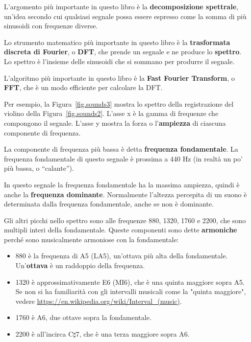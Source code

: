 \documentclass[12pt,a4paper]{book}
\begin{document}
L'argomento più importante in questo libro è la {\bf decomposizione spettrale}, un'idea secondo cui qualsiasi segnale possa essere espresso come la somma di più sinusoidi con frequenze diverse.

Lo strumento matematico più importante in questo libro è la {\bf trasformata discreta di Fourier}, o {\bf DFT}, che prende un segnale e ne produce lo {\bf spettro}. Lo spettro è l'insieme delle sinusoidi che si sommano per produrre il segnale.

L'algoritmo più importante in questo libro è la {\bf Fast Fourier Transform}, o {\bf FFT}, che è un modo efficiente per calcolare la DFT.

Per esempio, la Figura~\ref{fig.sounds3} mostra lo spettro della registrazione del violino della Figura~\ref{fig.sounds2}. L'asse x è la gamma di frequenze che compongono il segnale. L'asse y mostra la forza o l'{\bf ampiezza} di ciascuna componente di frequenza.

La componente di frequenza più bassa è detta {\bf frequenza fondamentale}. La frequenza fondamentale di questo segnale è prossima a 440 Hz (in realtà un po' più bassa, o ``calante'').

In questo segnale la frequenza fondamentale ha la massima ampiezza, quindi è anche la {\bf frequenza dominante}. Normalmente l'altezza percepita di un suono è determinata dalla frequenza fondamentale, anche se non è dominante.

Gli altri picchi nello spettro sono alle frequenze 880, 1320, 1760 e 2200, che sono multipli interi della fondamentale. Queste componenti sono dette {\bf armoniche} perché sono musicalmente armoniose con la fondamentale:

\begin{itemize} 

\item 880 è la frequenza di A5 (LA5), un'ottava più alta della fondamentale. Un'{\bf ottava} è un raddoppio della frequenza.

\item 1320 è approssimativamente E6 (MI6), che è una quinta maggiore sopra A5. Se non si ha familiarità con gli intervalli musicali come la "quinta maggiore", vedere \url{https://en.wikipedia.org/wiki/Interval_(music)}.

\item 1760 è A6, due ottave sopra la fondamentale.

\item 2200 è all'incirca C$\sharp$7, che è una terza maggiore sopra A6.

\end{itemize} 
\end{document}
